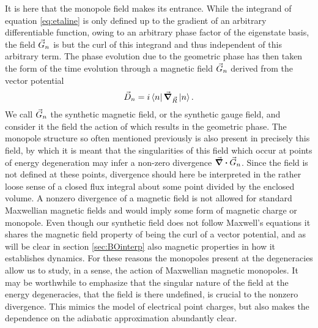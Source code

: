 \documentclass[main.tex]{subfiles}
\begin{document}
It is here that the monopole field makes its entrance. While the integrand of equation
\ref{eq:etaline} is only defined up to the gradient of an arbitrary differentiable function, owing to an arbitrary phase factor of
the eigenstate basis, the field \(\vec{G}_n\) is but the curl of this integrand and thus
independent of this arbitrary term. The phase evolution due to the geometric phase has
then taken the form of the time evolution through a magnetic field \(\vec{G}_n\) derived
from the vector potential
\begin{align}\label{eq:Dfield}
        \vec{D}_n = i\bra{n}\grad_{\vec{R}}\ket{n}
.\end{align}
We call \(\vec{G}_n\) the synthetic magnetic field, or the synthetic gauge field, and consider
it the field the action of which results in the geometric phase. The monopole
structure so often mentioned previously is also present in precisely this field, by which it is
meant that the singularities of this field which occur at points of energy degeneration may
infer a non-zero divergence \(\div \vec{G}_n\). Since the field is not defined at these points, divergence
should here be interpreted in the rather loose sense of a closed flux integral about some
point divided by the enclosed volume. A nonzero divergence of a magnetic field is not allowed for
standard Maxwellian magnetic fields and would imply some form of magnetic charge or
monopole. Even though our synthetic field does not follow Maxwell's equations it shares
the magnetic field property of being the curl of a vector potential, and as will be clear
in section \ref{sec:BOinterp} also magnetic properties in how it establishes dynamics. For
these reasons the monopoles present at the degeneracies allow us to study, in a sense, the
action of Maxwellian magnetic monopoles. It may be worthwhile to emphasize that the
singular nature of the field at the energy degeneracies, that the field is there undefined,
is crucial to the nonzero divergence. This mimics the model of electrical point charges,
but also makes the dependence on the adiabatic approximation abundantly clear.
\end{document}
